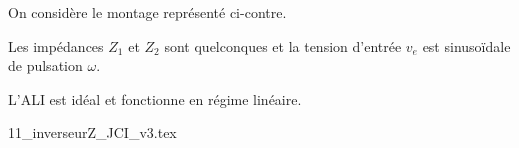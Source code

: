 \hauteurLargeurCadreReponse		{8mm}{3cm}
\typeEntrainement				{} %
\initialisationEntrainement


\initialisationPartieGauche %
On considère le montage représenté ci-contre. 

Les impédances \(Z_{1}\) et \(Z_{2}\) sont quelconques et la tension d’entrée \(v_{e}\) est sinusoïdale de pulsation \(\omega\).

L’ALI est idéal et fonctionne en régime linéaire.
\initialisationPartieDroite %
\begin{center}
  \shorthandoff{!:}
  {11_inverseurZ_JCI_v3.tex}
  \shorthandon{!:}
\end{center}
\finalisationDuPartageDePage %

\debutEntrainement


